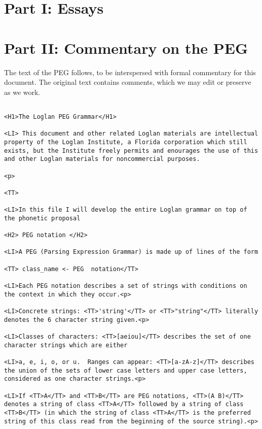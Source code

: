 \documentclass[12pt]{article}
\begin{document}
\newpage

\section{Part I:  Essays}

\newpage

\section{Part II:  Commentary on the PEG}

The text of the PEG follows, to be interspersed with formal commentary for this document.  The original text contains comments, which we may edit or preserve as we work.

\begin{lstlisting}

<H1>The Loglan PEG Grammar</H1>

<LI> This document and other related Loglan materials are intellectual property of the Loglan Institute, a Florida corporation which still exists, but the Institute freely permits and enourages the use of this and other Loglan materials for noncommercial purposes.

<p>

<TT>

<LI>In this file I will develop the entire Loglan grammar on top of the phonetic proposal

<H2> PEG notation </H2>

<LI>A PEG (Parsing Expression Grammar) is made up of lines of the form

<TT> class_name <- PEG  notation</TT>

<LI>Each PEG notation describes a set of strings with conditions on the context in which they occur.<p>

<LI>Concrete strings: <TT>'string'</TT> or <TT>"string"</TT> literally denotes the 6 character string given.<p>

<LI>Classes of characters: <TT>[aeiou]</TT> describes the set of one character strings which are either

<LI>a, e, i, o, or u.  Ranges can appear: <TT>[a-zA-z]</TT> describes the union of the sets of lower case letters and upper case letters, considered as one character strings.<p>

<LI>If <TT>A</TT> and <TT>B</TT> are PEG notations, <TT>(A B)</TT> denotes a string of class <TT>A</TT> followed by a string of class <TT>B</TT> (in which the string of class <TT>A</TT> is the preferred string of this class read from the beginning of the source string).<p>


\end{lstlisting}
\end{document}
